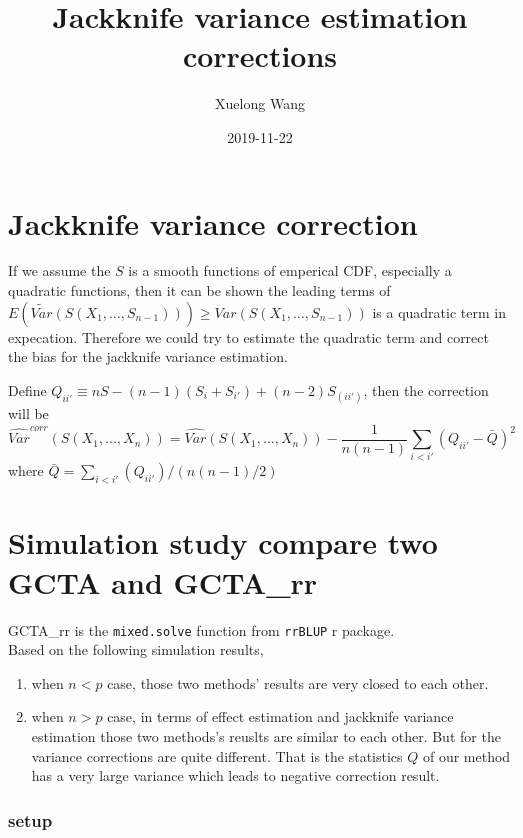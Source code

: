 \documentclass[]{article}
\title{Jackknife variance estimation corrections}
\author{Xuelong Wang}
\date{2019-11-22}
\providecommand{\tightlist}{%
  \setlength{\itemsep}{0pt}\setlength{\parskip}{0pt}}
\begin{document}
\maketitle

{
\setcounter{tocdepth}{2}
\tableofcontents
}
\section{Jackknife variance
correction}\label{jackknife-variance-correction}

If we assume the \(S\) is a smooth functions of emperical CDF,
especially a quadratic functions, then it can be shown the leading terms
of
\(E(\tilde{Var}(S(X_1, \dots, S_{n-1}))) \geq Var(S(X_1, \dots, S_{n-1}))\)
is a quadratic term in expecation. Therefore we could try to estimate
the quadratic term and correct the bias for the jackknife variance
estimation.

Define \(Q_{ii'} \equiv nS - (n-1)(S_{i} + S_{i'}) + (n-2)S_{(ii')}\),
then the correction will be \[
\hat{Var}^{corr}(S(X_1, \dots, X_n)) = \hat{Var}(S(X_1, \dots, X_n)) - \frac{1}{n(n-1)}\sum_{i < i'}(Q_{ii'}- \bar{Q})^2
\] where \(\bar{Q} = \sum_{i < i'}(Q_{ii'})/(n(n-1)/2)\)

\section{Simulation study compare two GCTA and
GCTA\_rr}\label{simulation-study-compare-two-gcta-and-gcta_rr}

GCTA\_rr is the \texttt{mixed.solve} function from \texttt{rrBLUP} r
package.\\
Based on the following simulation results,

\begin{enumerate}
\def\labelenumi{\arabic{enumi}.}
\tightlist
\item
  when \(n<p\) case, those two methods' results are very closed to each
  other.
\item
  when \(n>p\) case, in terms of effect estimation and jackknife
  variance estimation those two methods's reuslts are similar to each
  other. But for the variance corrections are quite different. That is
  the statistics \(Q\) of our method has a very large variance which
  leads to negative correction result.
\end{enumerate}

\subsubsection{setup}\label{setup}
\end{document}
